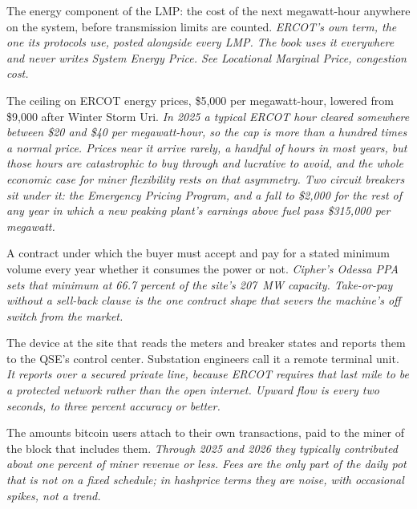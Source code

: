 \begin{description}[leftmargin=0pt,style=unboxed,itemsep=0.35em,parsep=0.15em]
\item[System Lambda] \hypertarget{glossary:system-lambda}{}The energy component of the LMP: the cost of the next megawatt-hour anywhere on the system, before transmission limits are counted. \emph{ERCOT's own term, the one its protocols use, posted alongside every LMP. The book uses it everywhere and never writes System Energy Price. See Locational Marginal Price, congestion cost.}
\item[system-wide offer cap] \hypertarget{glossary:system-wide-offer-cap}{}The ceiling on ERCOT energy prices, \$5,000 per megawatt-hour, lowered from \$9,000 after Winter Storm Uri. \emph{In 2025 a typical ERCOT hour cleared somewhere between \$20 and \$40 per megawatt-hour, so the cap is more than a hundred times a normal price. Prices near it arrive rarely, a handful of hours in most years, but those hours are catastrophic to buy through and lucrative to avoid, and the whole economic case for miner flexibility rests on that asymmetry. Two circuit breakers sit under it: the Emergency Pricing Program, and a fall to \$2,000 for the rest of any year in which a new peaking plant's earnings above fuel pass \$315,000 per megawatt.}
\item[take-or-pay] \hypertarget{glossary:take-or-pay}{}A contract under which the buyer must accept and pay for a stated minimum volume every year whether it consumes the power or not. \emph{Cipher's Odessa PPA sets that minimum at 66.7 percent of the site's 207~MW capacity. Take-or-pay without a sell-back clause is the one contract shape that severs the machine's off switch from the market.}
\item[telemetry gateway (RTU, remote terminal unit)] \hypertarget{glossary:telemetry-gateway}{}The device at the site that reads the meters and breaker states and reports them to the QSE's control center. Substation engineers call it a remote terminal unit. \emph{It reports over a secured private line, because ERCOT requires that last mile to be a protected network rather than the open internet. Upward flow is every two seconds, to three percent accuracy or better.}
\item[transaction fees] \hypertarget{glossary:transaction-fees}{}The amounts bitcoin users attach to their own transactions, paid to the miner of the block that includes them. \emph{Through 2025 and 2026 they typically contributed about one percent of miner revenue or less. Fees are the only part of the daily pot that is not on a fixed schedule; in hashprice terms they are noise, with occasional spikes, not a trend.}

\end{description}
